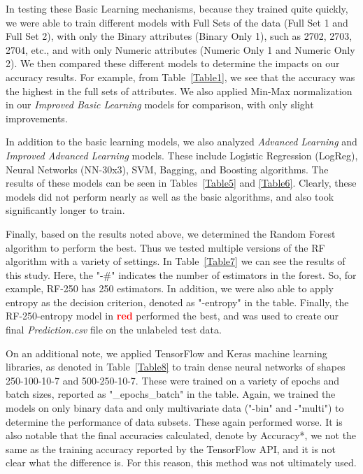 \documentclass[10pt, conference, compsocconf]{IEEEtran}
\newcommand{\red}[1]{\textcolor{red}{\bf #1}}
\begin{document}
In testing these Basic Learning mechanisms, because they trained quite quickly, we were able to train different models with Full Sets of the data (Full Set 1 and Full Set 2), with only the Binary attributes (Binary Only 1), such as 2702, 2703, 2704, etc., and with only Numeric attributes (Numeric Only 1 and Numeric Only 2). We then compared these different models to determine the impacts on our accuracy results. For example, from Table~\ref{Table1}, we see that the accuracy was the highest in the full sets of attributes. We also applied Min-Max normalization in our \textit{Improved Basic Learning} models for comparison, with only slight improvements. 

In addition to the basic learning models, we also analyzed \textit{Advanced Learning} and \textit{Improved Advanced Learning} models. These include Logistic Regression (LogReg), Neural Networks (NN-30x3), SVM, Bagging, and Boosting algorithms. The results of these models can be seen in Tables~\ref{Table5} and \ref{Table6}. Clearly, these models did not perform nearly as well as the basic algorithms, and also took significantly longer to train. 

Finally, based on the results noted above, we determined the Random Forest algorithm to perform the best. Thus we tested multiple versions of the RF algorithm with a variety of settings. In Table~\ref{Table7} we can see the results of this study. Here, the "-\#" indicates the number of estimators in the forest. So, for example, RF-250 has 250 estimators. In addition, we were also able to apply entropy as the decision criterion, denoted as "-entropy" in the table. Finally, the RF-250-entropy model in \red{red} performed the best, and was used to create our final \textit{Prediction.csv} file on the unlabeled test data. 

On an additional note, we applied TensorFlow and Keras machine learning libraries, as denoted in Table~\ref{Table8} to train dense neural networks of shapes 250-100-10-7 and 500-250-10-7. These were trained on a variety of epochs and batch sizes, reported as "\_epochs\_batch" in the table. Again, we trained the models on only binary data and only multivariate data ("-bin" and -"multi") to determine the performance of data subsets. These again performed worse. It is also notable that the final accuracies calculated, denote by Accuracy*, we not the same as the training accuracy reported by the TensorFlow API, and it is not clear what the difference is. For this reason, this method was not ultimately used.
 
\end{document}
